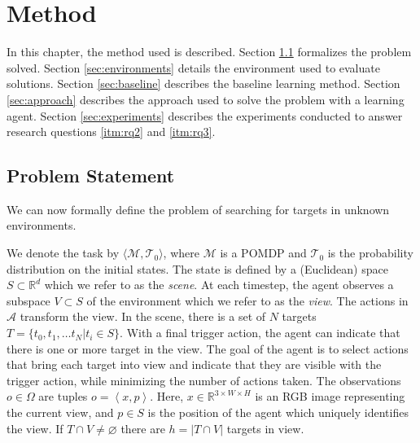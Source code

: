 \chapter{Method}
\label{cha:method}


% 

In this chapter, the method used is described.
Section \ref{sec:problem} formalizes the problem solved.
Section \ref{sec:environments} details the environment used to evaluate solutions.
Section \ref{sec:baseline} describes the baseline learning method.
Section \ref{sec:approach} describes the approach used to solve the problem with a learning agent.
Section \ref{sec:experiments} describes the experiments conducted to answer research questions \ref{itm:rq2} and \ref{itm:rq3}.

\section{Problem Statement}
\label{sec:problem}


We can now formally define the problem of searching for targets in unknown environments.

We denote the task by \(\langle \mathcal{M}, \mathcal{T}_0 \rangle\), where \(\mathcal{M}\) is a POMDP and \(\mathcal{T}_0\) is the probability distribution on the initial states.
The state is defined by a (Euclidean) space \(S \subset \mathbb{R}^d\) which we refer to as the \textit{scene}.
At each timestep, the agent observes a subspace \(V \subset S\) of the environment which we refer to as the \textit{view}.
The actions in \(\mathcal{A}\) transform the view.
In the scene, there is a set of \(N\) targets \(T = \{t_0, t_1, \dots t_N | t_i \in S\}\).
With a final trigger action, the agent can indicate that there is one or more target in the view.
The goal of the agent is to select actions that bring each target into view and indicate that they are visible with the trigger action, while minimizing the number of actions taken.
The observations \(o \in \Omega\) are tuples \(o = \left\langle x, p \right\rangle\).
Here, \(x \in \mathbb{R}^{3 \times W \times H}\) is an RGB image representing the current view, and \(p \in S\) is the position of the agent which uniquely identifies the view.
If \(T \cap V \neq \varnothing\) there are \(h = \left\lvert T \cap V \right\rvert\) targets in view.


